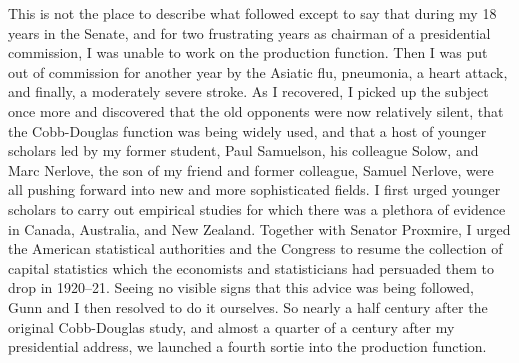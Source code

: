\documentclass{article}
\begin{document}
This is not the place to describe what followed except to say that during my 18 years in the Senate, and for two frustrating years as chairman of a presidential commission, I was unable to work on the production function. Then I was put out of commission for another year by the Asiatic flu, pneumonia, a heart attack, and finally, a moderately severe stroke. As I recovered, I picked up the subject once more and discovered that the old opponents were now relatively silent, that the Cobb-Douglas function was being widely used, and that a host of younger scholars led by my former student, Paul Samuelson, his colleague Solow, and Marc Nerlove, the son of my friend and former colleague, Samuel Nerlove, were all pushing forward into new and more sophisticated fields. I first urged younger scholars to carry out empirical studies for which there was a plethora of evidence in Canada, Australia, and New Zealand. Together with Senator Proxmire, I urged the American statistical authorities and the Congress to resume the collection of capital statistics which the economists and statisticians had persuaded them to drop in 1920--21. Seeing no visible signs that this advice was being followed, Gunn and I then resolved to do it ourselves. So nearly a half century after the original Cobb-Douglas study, and almost a quarter of a century after my presidential address, we launched a fourth sortie into the production function.
\end{document}
